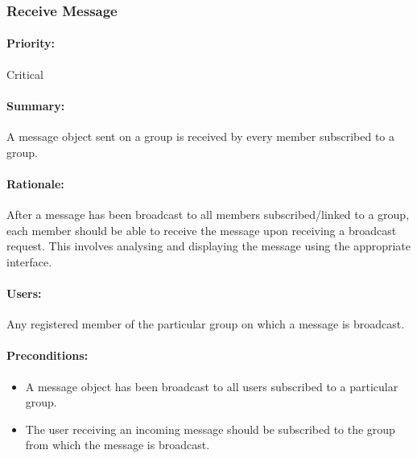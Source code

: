 \documentclass[11pt]{article}
\begin{document}
\subsubsection{Receive Message} \label{UC-receive-message}
\paragraph{Priority:} Critical
\paragraph{Summary:} A message object sent on a group is received by every member subscribed to a group.
\paragraph{Rationale:} After a message has been broadcast to all members subscribed/linked to a group, each member should be able to receive the message upon receiving a broadcast request. This involves analysing and displaying the message using the appropriate interface. 
\paragraph{Users:} Any registered member of the particular group on which a message is broadcast.
\paragraph{Preconditions:} 
\begin{itemize}
\item A message object has been broadcast to all users subscribed to a particular group.
\item The user receiving an incoming message should be subscribed to the group from which the message is broadcast.
\end{itemize}
\end{document}

